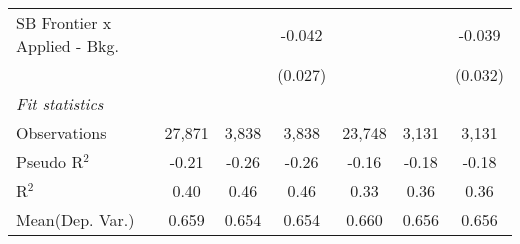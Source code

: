 \begin{tabular}{lcccccc}
   SB Frontier x Applied - Bkg.   &              &             & -0.042         &                &             & -0.039\\   
                                  &              &             & (0.027)        &                &             & (0.032)\\   
   \midrule
   \emph{Fit statistics}\\
   Observations                   & 27,871       & 3,838       & 3,838          & 23,748         & 3,131       & 3,131\\  
   Pseudo R$^2$                   & -0.21        & -0.26       & -0.26          & -0.16          & -0.18       & -0.18\\  
   R$^2$                          & 0.40         & 0.46        & 0.46           & 0.33           & 0.36        & 0.36\\  
Mean(Dep. Var.) & 0.659 & 0.654 & 0.654 & 0.660 & 0.656 & 0.656 \\
   

\end{tabular}
